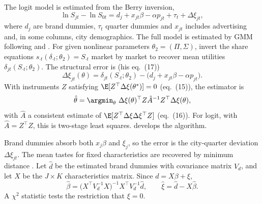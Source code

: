  The logit model is estimated from the Berry inversion,
\begin{equation}\label{eq:11-nevo-logit}
  \ln S_{jt} - \ln S_{0t} = d_j + x_{jt}\beta - \alpha p_{jt} + \tau_t + \Delta\xi_{jt} ,
\end{equation}
where $d_j$ are brand dummies, $\tau_t$ quarter dummies and $x_{jt}$ includes advertising and, in some columns, city
demographics. The full model is estimated by GMM following \citet{Berry1994} and \citet{BerryLevinsohnPakes1995}. For
given nonlinear parameters $\theta_2 = (\Pi, \Sigma)$, invert the share equations $s_{\cdot t}(\delta_{\cdot t};\theta_2)
= S_{\cdot t}$ market by market to recover mean utilities $\delta_{jt}(S_{\cdot t};\theta_2)$. The structural error is
(his eq.~(17))
\begin{equation*}
  \Delta\xi_{jt}(\theta) = \delta_{jt}(S_{\cdot t};\theta_2) - \big(d_j + x_{jt}\beta - \alpha p_{jt}\big) .
\end{equation*}
With instruments $Z$ satisfying $\E[Z^\top \Delta\xi(\theta^*)] = 0$ (eq.~(15)), the estimator is
\begin{equation*}
  \hat\theta = \argmin_\theta\ \Delta\xi(\theta)^\top Z \hat A^{-1} Z^\top \Delta\xi(\theta) ,
\end{equation*}
with $\hat A$ a consistent estimate of $\E[Z^\top \Delta\xi\Delta\xi^\top Z]$ (eq.~(16)). For logit, with $\hat A = Z^\top Z$, this is two-stage
least squares.  develops the algorithm.

Brand dummies absorb both $x_j\beta$ and $\xi_j$, so the error is the city-quarter deviation $\Delta\xi_{jt}$. The mean
tastes for fixed characteristics are recovered by minimum distance \citep{Chamberlain1982}. Let $\hat d$ be the
estimated brand dummies with covariance matrix $V_d$, and let $X$ be the $J \times K$ characteristics matrix. Since
$d = X\beta + \xi$,
\begin{equation*}
  \hat\beta = \big(X^\top V_d^{-1} X\big)^{-1} X^\top V_d^{-1} \hat d , \qquad \hat\xi = \hat d - X\hat\beta .
\end{equation*}
A $\chi^2$ statistic tests the restriction that $\xi = 0$.

